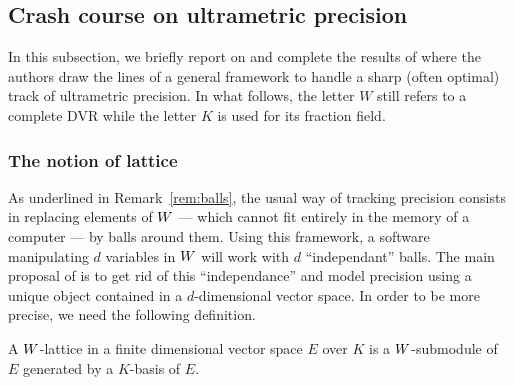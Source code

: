\documentclass{article}
\begin{document}
\subsection{Crash course on ultrametric precision}
\label{subsec:crashcourse}

In this subsection, we briefly report on and complete the results of 
\cite{padicprec} where the authors draw the lines of a general framework 
to handle a sharp (often optimal) track of ultrametric precision. In 
what follows, the letter $W$ still refers to a complete DVR while the 
letter $K$ is used for its fraction field.

\subsubsection{The notion of lattice}

As underlined in Remark~\ref{rem:balls}, the usual way of tracking 
precision consists in replacing elements of $W$ --- which cannot fit 
entirely in the memory of a computer --- by balls around them. Using 
this framework, a software manipulating $d$ variables in $W$ will work 
with $d$ ``independant'' balls. The main proposal of \cite{padicprec} is 
to get rid of this ``independance'' and model precision using a unique
object contained in a $d$-dimensional vector space. In order to be more
precise, we need the following definition.

\begin{deftn}
A $W$-lattice in a finite dimensional vector space $E$ over $K$ is
a $W$-submodule of $E$ generated by a $K$-basis of $E$.
\end{deftn}
\end{document}
